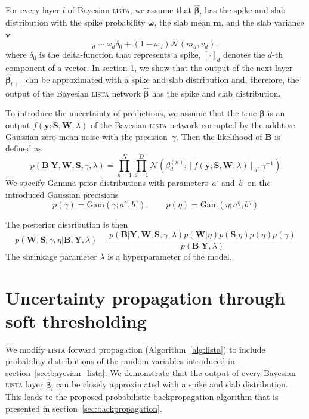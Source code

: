\documentclass{article}
\begin{document}
  For every layer $l$ of Bayesian \textsc{lista}, we assume that $\widehat{\boldsymbol\beta}_{l}$ has the spike and slab distribution with the spike probability $\boldsymbol\omega$, the slab mean $\mathbf{m}$, and the slab variance $\mathbf{v}$
  \begin{equation}
  [\widehat{\boldsymbol\beta}_{l}]_d \sim \omega_d \delta_0 + (1 - \omega_d)\mathcal{N}(m_d, v_d),
  \end{equation}
  where $\delta_0$ is the delta-function that represents a spike, $[\cdot]_d$ denotes the $d$-th component of a vector. In section \ref{sec:fprop}, we show that the output of the next layer $\widehat{\boldsymbol\beta}_{l+1}$ can be approximated with a spike and slab distribution and, therefore, the output of the Bayesian \textsc{lista} network $\widehat{\boldsymbol\beta}$ has the spike and slab distribution.
  
  To introduce the uncertainty of predictions, we assume that the true $\boldsymbol\beta$ is an output $f(\mathbf{y} ; \mathbf{S}, \mathbf{W}, \lambda)$ of the Bayesian \textsc{lista} network corrupted by the additive Gaussian zero-mean noise with the precision~$\gamma$. Then the likelihood of $\mathbf{B}$ is defined as
  \begin{equation}
  \label{eq:likelihood}
  p(\mathbf{B}| \mathbf{Y}, \mathbf{W}, \mathbf{S}, \gamma, \lambda) = \prod_{n=1}^N\prod_{d=1}^D\mathcal{N}\left(\beta_d^{(n)}; [f(\mathbf{y} ; \mathbf{S}, \mathbf{W}, \lambda)]_d, \gamma^{-1}\right)
  \end{equation}
  We specify Gamma prior distributions with parameters~$a^{\cdot}$ and~$b^{\cdot}$ on the introduced Gaussian precisions
  \begin{equation}
  \label{eq:gamma_eta}
  p(\gamma) = \text{Gam}\left(\gamma; a^{\gamma}, b^{\gamma}\right), \qquad
  p(\eta) = \text{Gam}\left(\eta; 	a^{\eta}, b^{\eta}\right)
  \end{equation}
  
  The posterior distribution is then
  \begin{equation}
  \label{eq:posterior}
  p(\mathbf{W}, \mathbf{S}, \gamma, \eta | \mathbf{B}, \mathbf{Y}, \lambda) = \frac{p(\mathbf{B} | \mathbf{Y}, \mathbf{W},  \mathbf{S}, \gamma, \lambda) p(\mathbf{W} | \eta )p(\mathbf{S} | \eta) p(\eta) p(\gamma)}{p(\mathbf{B} | \mathbf{Y}, \lambda)}
  \end{equation}
  The shrinkage parameter $\lambda$ is a hyperparameter of the model.
  
  \section{Uncertainty propagation through soft thresholding}
  \label{sec:fprop}
  We modify \textsc{lista} forward propagation (Algorithm~\ref{alg:lista}) to include probability distributions of the random variables introduced in section~\ref{sec:bayesian_lista}.
  We demonstrate that the output of every Bayesian \textsc{lista} layer $\widehat{\boldsymbol\beta}_l$ can be closely approximated with a spike and slab distribution. This leads to the proposed probabilistic backpropagation algorithm that is presented in section~\ref{sec:backpropagation}.
  
\end{document}
